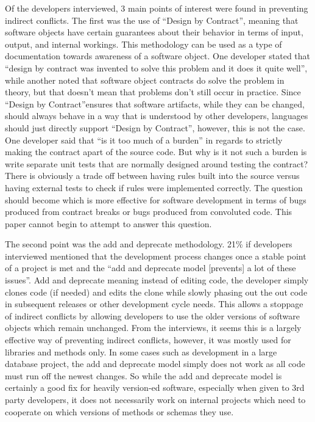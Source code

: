 \documentclass[conference]{IEEEtran}
\begin{document}
Of the developers interviewed, 3 main points of interest were found in preventing indirect conflicts. The first was
the use of ``Design by Contract''\texttrademark, meaning that software objects have certain guarantees about their behavior
in terms of input, output, and internal workings. This methodology can be used as a type of documentation towards awareness of
a software object. One developer stated that ``design by contract was invented to solve this problem and it does it quite well'', 
while another noted that software object contracts do solve the problem in theory, but that doesn't mean that problems don't 
still occur in practice.  Since ``Design by Contract''\texttrademark ensures that software artifacts, while they can be changed, 
should always behave in a way that is understood by other developers, languages should just directly support ``Design by Contract''\texttrademark,
however, this is not the case. One developer said that ``is it too much of a burden'' in regards to strictly making the contract
apart of the source code. But why is it not such a burden is write separate unit tests that are normally designed around testing
the contract? There is obviously a trade off between having rules built into the source versus having external tests to check if rules
were implemented correctly. The question should become which is more effective for software development in terms of bugs produced 
from contract breaks or bugs produced from convoluted code. This paper cannot begin to attempt to answer this question.

The second point was the add and deprecate methodology. 21\% if developers interviewed mentioned 
that the development process changes once a stable point of a project is met and the ``add and deprecate model [prevents] a lot 
of these issues''. Add and deprecate meaning instead of editing code, the developer simply clones code (if needed) and edits the clone
while slowly phasing out the out code in subsequent releases or other development cycle needs. This allows a stoppage of indirect conflicts
by allowing developers to use the older versions of software objects which remain unchanged. From the interviews, it seems this is a largely
effective way of preventing indirect conflicts, however, it was mostly used for libraries and methods only. In some cases such as development
in a large database project, the add and deprecate model simply does not work as all code must run off the newest changes. So while the
add and deprecate model is certainly a good fix for heavily version-ed software, especially when given to 3rd party developers, it does
not necessarily work on internal projects which need to cooperate on which versions of methods or schemas they use.
\end{document}
